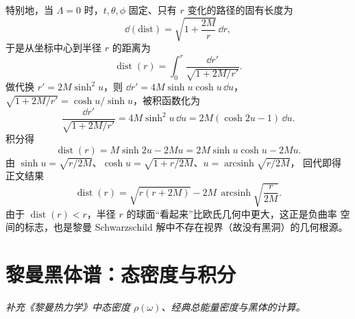 特别地，当 $\Lambda=0$ 时，$t,\theta,\phi$ 固定、只有 $r$ 变化的路径的固有长度为
\begin{equation}
\dd(\text{dist})=\sqrt{1+\frac{2M}{r}}\,\dd r ,
\end{equation}
于是从坐标中心到半径 $r$ 的距离为
\begin{equation}
\operatorname{dist}(r)=\int_{0}^{r}\frac{\dd r'}{\sqrt{1+2M/r'}} .
\tag{B.9}
\end{equation}
做代换 $r'=2M\sinh^{2}u$，则 $\dd r'=4M\sinh u\cosh u\,\dd u$，
$\sqrt{1+2M/r'}=\cosh u/\sinh u$，被积函数化为
\begin{equation}
\frac{\dd r'}{\sqrt{1+2M/r'}}=4M\sinh^{2}u\,\dd u=2M(\cosh 2u-1)\,\dd u .
\end{equation}
积分得
\begin{equation}
\operatorname{dist}(r)=M\sinh 2u-2M u=2M\sinh u\cosh u-2M u .
\end{equation}
由 $\sinh u=\sqrt{r/2M}$、$\cosh u=\sqrt{1+r/2M}$、$u=\operatorname{arcsinh}\sqrt{r/2M}$，
回代即得正文结果
\begin{equation}
\operatorname{dist}(r)=\sqrt{r(r+2M)}-2M\,\operatorname{arcsinh}\!\sqrt{\frac{r}{2M}} .
\end{equation}
由于 $\operatorname{dist}(r)<r$，半径 $r$ 的球面“看起来”比欧氏几何中更大，这正是负曲率
空间的标志，也是黎曼 Schwarzschild 解中不存在视界（故没有黑洞）的几何根源。

\section{黎曼黑体谱：态密度与积分}
\emph{补充《黎曼热力学》中态密度 $\rho(\omega)$、经典总能量密度与黑体的计算。}

